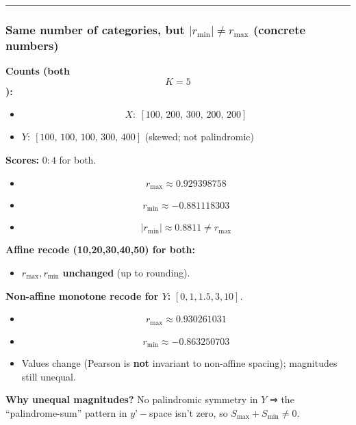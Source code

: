\documentclass[
  12pt,
]{article}
\providecommand{\tightlist}{%
  \setlength{\itemsep}{0pt}\setlength{\parskip}{0pt}}
\theoremstyle{plain}
\theoremstyle{definition}
\theoremstyle{remark}
\begin{document}
\begin{center}\rule{0.5\linewidth}{0.5pt}\end{center}

\subsubsection{\texorpdfstring{\textbf{Same number of categories, but
\(|r_{\min}|\ne r_{\max}\)} (concrete
numbers)}{Same number of categories, but \textbar r\_\{\textbackslash min\}\textbar\textbackslash ne r\_\{\textbackslash max\} (concrete numbers)}}\label{same-number-of-categories-but-r_minne-r_max-concrete-numbers}

\textbf{Counts (both \[K=5\]):}

\begin{itemize}
\item
  \[X:\ [100,\,200,\,300,\,200,\,200]\]
\item
  \(Y:\ [100,\,100,\,100,\,300,\,400]\) (skewed; not palindromic)
\end{itemize}

\textbf{Scores:} \(0{:}4\) for both.

\begin{itemize}
\item
  \[r_{\max}\approx 0.929398758\]
\item
  \[r_{\min}\approx -0.881118303\]
\item
  \[|r_{\min}| \approx 0.8811 \ne r_{\max}\]
\end{itemize}

\textbf{Affine recode (10,20,30,40,50) for both:}

\begin{itemize}
\tightlist
\item
  \(r_{\max}, r_{\min}\) \textbf{unchanged} (up to rounding).
\end{itemize}

\textbf{Non-affine monotone recode for \(Y\):} \([0,1,1.5,3,10]\).

\begin{itemize}
\item
  \[r_{\max}\approx 0.930261031\]
\item
  \[r_{\min}\approx -0.863250703\]
\item
  Values change (Pearson is \textbf{not} invariant to non-affine
  spacing); magnitudes still unequal.
\end{itemize}

\textbf{Why unequal magnitudes?} No palindromic symmetry in \(Y\) ⇒ the
``palindrome-sum'' pattern in \(y’-\)space isn't zero, so
\(S_{\max}+S_{\min}\ne 0\).
\end{document}
